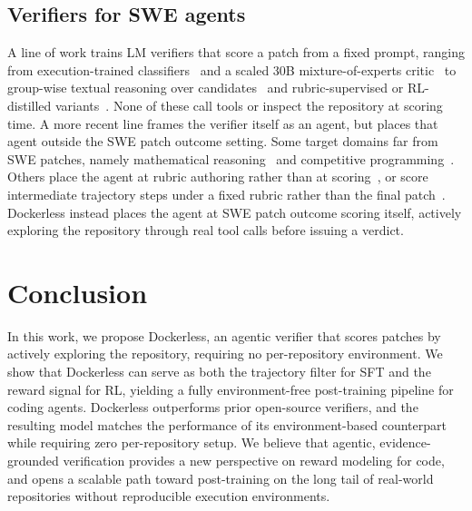 \documentclass[]{arxiv_template}
\newcommand{\approach}{Dockerless\xspace}
\newcommand{\zeng}[1]{\textcolor[rgb]{1,0.66,0}{\textbf{[Zeng: #1]}}}
\begin{document}
\subsection{Verifiers for SWE agents}
A line of work trains LM verifiers that score a patch from a fixed prompt, ranging from execution-trained classifiers~\citep{pan2025training, jain2025r2e} and a scaled 30B mixture-of-experts critic~\citep{shum2025swe} to group-wise textual reasoning over candidates~\citep{xu2025scalable} and rubric-supervised or RL-distilled variants~\citep{wang2026rubric, luo2025deepswe}.
None of these call tools or inspect the repository at scoring time.
A more recent line frames the verifier itself as an agent, but places that agent outside the SWE patch outcome setting.
Some target domains far from SWE patches, namely mathematical reasoning~\citep{zhang2026agentv,zeng2026glimprouter} and competitive programming~\citep{ma2026scaling,hu2026line,Gao0GL25,abs-2510-17130}.
Others place the agent at rubric authoring rather than at scoring~\citep{raghavendra2026agentic}, or score intermediate trajectory steps under a fixed rubric rather than the final patch~\citep{han2026swe}.
\approach instead places the agent at SWE patch outcome scoring itself, actively exploring the repository through real tool calls before issuing a verdict.


\section{Conclusion}

In this work, we propose \approach, an agentic verifier that scores patches by actively exploring the repository, requiring no per-repository environment.
We show that \approach can serve as both the trajectory filter for SFT and the reward signal for RL, yielding a fully environment-free post-training pipeline for coding agents.
\approach outperforms prior open-source verifiers, and the resulting model matches the performance of its environment-based counterpart while requiring zero per-repository setup.
We believe that agentic, evidence-grounded verification provides a new perspective on reward modeling for code, and opens a scalable path toward post-training on the long tail of real-world repositories without reproducible execution environments.
\end{document}
